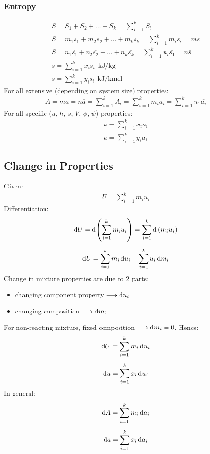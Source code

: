\subsubsection{Entropy}
\begin{gather}
  S = S_1 + S_2 + \dots + S_k = \sum_{i=1}^{k}S_i \\[5pt]
  S = m_1s_1 + m_2s_2 + \dots + m_ks_k = \sum_{i=1}^{k}m_is_i = ms \\[5pt]
  S = n_1\overline{s_1} + n_2\overline{s_2} + \dots + n_k\overline{s_k} = \sum_{i=1}^{k} n_i\overline{s_1} = n\overline{s} \\[5pt]
  s = \sum_{i=1}^{k} x_i s_i \ \ \si{\kilo\joule\per\kilogram} \\[5pt]
  \overline{s} = \sum_{i=1}^{k} y_i \overline{s_i} \ \ \si{\kilo\joule\per\kilo\mole}
\end{gather}
For all extensive (depending on system size) properties:
\begin{gather}
  A = ma = n\overline{a} = \sum_{i=1}^{k}A_i = \sum_{i=1}^{k}m_i a_i = \sum_{i=1}^{k}n_1\overline{a_i}
\end{gather}
For all specific ($u$, $h$, $s$, $V$, $\phi$, $\psi$) properties:
\begin{gather}
  a = \sum_{i=1}^{k}x_i a_i \\[5pt]
  \overline{a} = \sum_{i=1}^{k}y_i \overline{a_i}
\end{gather}
\subsection{Change in Properties}
Given:
\begin{gather}
  U = \sum_{i=1}^{k}m_i u_i
\end{gather}
Differentiation:
\begin{gather}
  \dif U = \dif\left(\sum_{i=1}^{k}m_i u_i\right) = \sum_{i=1}^{k}\dif\ (m_i u_i) \\[5pt]
  \dif U = \sum_{i=1}^{k}m_i\dif u_i + \sum_{i=1}^{k}u_i\dif m_i
\end{gather}
Change in mixture properties are due to 2 parts:
\begin{itemize}[noitemsep]
  \item changing component property $\longrightarrow \dif u_i$
  \item changing composition $\longrightarrow \dif m_i$
\end{itemize}
For non-reacting mixture, fixed composition $\longrightarrow \dif m_i = 0$. Hence:
\begin{gather}
  \dif U = \sum_{i=1}^{k}m_i\dif u_i \\[5pt]
  \dif u = \sum_{i=1}^{k}x_i\dif u_i
\end{gather}
In general:
\begin{gather}
  \dif A = \sum_{i=1}^{k}m_i \dif a_i \\[5pt]
  \dif a = \sum_{i=1}^{k}x_i \dif a_i
\end{gather}
